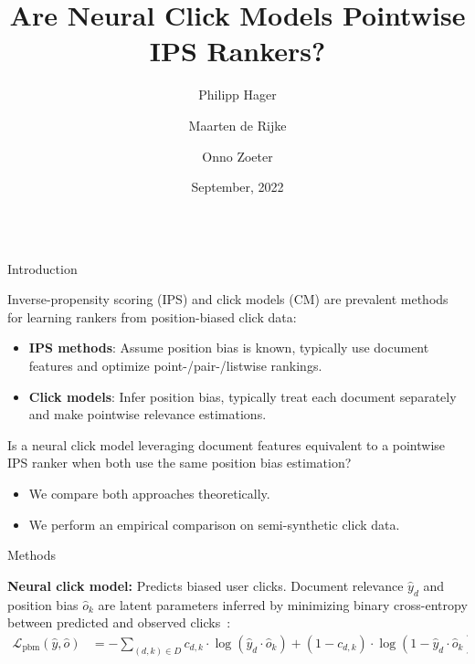 \documentclass[final]{beamer}
\title{\huge Are Neural Click Models Pointwise IPS Rankers?}
\author{Philipp Hager\inst{1} \and Maarten de Rijke\inst{1} \and Onno Zoeter\inst{2}}
\institute[shortinst]{\inst{1} University of Amsterdam \inst{2} Booking.com}
\date[Sep. 2022]{September, 2022}
\newlength{\onecolwid}
\begin{document}
\begin{frame}[t]
	\begin{columns}[t]
	\begin{column}{\onecolwid}
		
	\begin{block}{Introduction}

		Inverse-propensity scoring (IPS) and click models (CM) are prevalent methods for learning rankers from position-biased click data:
		\vspace{1ex}
		\begin{itemize}
			\item {\bf IPS methods}: Assume position bias is known, typically use document features and optimize point-/pair-/listwise rankings.
			\item {\bf Click models}: Infer position bias, typically treat each document separately and make pointwise relevance estimations.
		\end{itemize}

		\vspace{1ex}

		Is a neural click model leveraging document features equivalent to a pointwise IPS ranker when both use the same position bias estimation?

		\vspace{1ex}

		\begin{itemize}
			\item We compare both approaches theoretically.
			\item We perform an empirical comparison on semi-synthetic click data.
		\end{itemize}

	\end{block}

	\vspace{1ex}

	\begin{block}{Methods}

		\textbf{Neural click model:} Predicts biased user clicks. Document relevance $\hat{y}_d$ and position bias $\hat{o}_k$ are latent parameters inferred by minimizing binary cross-entropy between predicted and observed clicks~\cite{Yan2022TwoTowers}:
		\vspace{1ex}
		\begin{equation*}
			\begin{split}
			\mathcal{L}_{\text{pbm}}(\hat{y}, \hat{o}) &= - \sum_{(d, k) \in D} c_{d,k} \cdot \log(\hat{y}_{d} \cdot \hat{o}_{k}) + (1 - c_{d,k}) \cdot \log(1 - \hat{y}_{d} \cdot \hat{o}_{k}).
			\end{split}
		\end{equation*}


\end{block}
\end{column}
\end{columns}
\end{frame}
\end{document}
